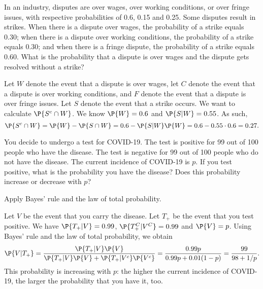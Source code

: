 	\begin{exercise}
		In an industry, disputes are over wages, over working conditions, or over fringe issues, with respective probabilities of 0.6, 0.15 and 0.25. Some disputes result in strikes. When there is a dispute over wages, the probability of a strike equals 0.30; when there is a dispute over working conditions, the probability of a strike equals 0.30; and when there is a fringe dispute, the probability of a strike equals 0.60. What is the probability that a dispute is over wages and the dispute gets resolved without a strike?
		\begin{solution}
			Let $W$ denote the event that a dispute is over wages, let $C$ denote the event that a dispute is over working conditions, and $F$ denote the event that a dispute is over fringe issues. Let $S$ denote the event that a strike occurs. We want to calculate $\P{S^c \cap W}$. We know $\P{W} = 0.6$ and $\P{S|W} = 0.55$. As such,
			\begin{equation*}
				\P{S^c \cap W} = \P{W} - \P{S \cap W} = 0.6 - \P{S|W} \P{W} = 0.6 - 0.55 \cdot 0.6 = 0.27.
			\end{equation*}
		\end{solution}
	\end{exercise}
	
	\begin{exercise}
		You decide to undergo a test for COVID-19. The test is positive for 99 out of 100 people who have the disease. The test is negative for 99 out of 100 people who do not have the disease. The current incidence of COVID-19 is $p$. If you test positive, what is the probability you have the disease? Does this probability increase or decrease with $p$?
		\begin{hint}
			Apply Bayes' rule and the law of total probability.
		\end{hint}
		\begin{solution}
			Let $V$ be the event that you carry the disease. Let $T_+$ be the event that you test positive. We have $\P{T_+ | V} = 0.99$, $\P{T_+^C | V^C} = 0.99$ and $\P{V} = p$. Using Bayes' rule and the law of total probability, we obtain
			\begin{equation*}
				\P{V | T_+} = \frac{\P{T_+ | V} \P{V}}{\P{T_+ | V} \P{V} + \P{T_+ | V^c} \P{V^c}} = \frac{0.99p}{0.99p + 0.01(1 - p)} = \frac{99}{98 + 1 / p}.
			\end{equation*}
			This probability is increasing with $p$: the higher the current incidence of COVID-19, the larger the probability that you have it, too.
		\end{solution}
	\end{exercise}
	

